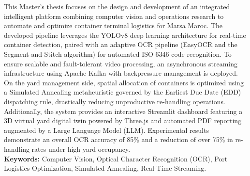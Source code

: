 \documentclass[12pt,a4paper]{article}
\begin{document}
\begin{tcolorbox}[colframe=SectionColor, colback=white, title=\textbf{Abstract (English)}, arc=4pt]
This Master's thesis focuses on the design and development of an integrated intelligent platform combining computer vision and operations research to automate and optimize container terminal logistics for Marsa Maroc. The developed pipeline leverages the YOLOv8 deep learning architecture for real-time container detection, paired with an adaptive OCR pipeline (EasyOCR and the Segment-and-Stitch algorithm) for automated ISO 6346 code recognition. To ensure scalable and fault-tolerant video processing, an asynchronous streaming infrastructure using Apache Kafka with backpressure management is deployed. On the yard management side, spatial allocation of containers is optimized using a Simulated Annealing metaheuristic governed by the Earliest Due Date (EDD) dispatching rule, drastically reducing unproductive re-handling operations. Additionally, the system provides an interactive Streamlit dashboard featuring a 3D virtual yard digital twin powered by Three.js and automated PDF reporting augmented by a Large Language Model (LLM). Experimental results demonstrate an overall OCR accuracy of 85\% and a reduction of over 75\% in re-handling rates under high yard occupancy.
\\[6pt]
\textbf{Keywords:} Computer Vision, Optical Character Recognition (OCR), Port Logistics Optimization, Simulated Annealing, Real-Time Streaming.
\end{tcolorbox}

\clearpage
{}
\setcounter{page}{1}

\tableofcontents
\newpage

\listoffigures
{}
\newpage

\listoftables
{}
\newpage

\end{document}
